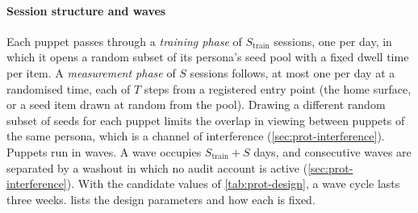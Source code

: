 \paragraph{Session structure and waves}
Each puppet passes through a \emph{training phase} of $S_{\mathrm{train}}$ sessions, one per day, in which it opens a random subset of its persona's seed pool with a fixed dwell time per item. A \emph{measurement phase} of $S$ sessions follows, at most one per day at a randomised time, each of $T$ steps from a registered entry point (the home surface, or a seed item drawn at random from the pool). Drawing a different random subset of seeds for each puppet limits the overlap in viewing between puppets of the same persona, which is a channel of interference (\cref{sec:prot-interference}). Puppets run in waves. A wave occupies $S_{\mathrm{train}}+S$ days, and consecutive waves are separated by a washout in which no audit account is active (\cref{sec:prot-interference}). With the candidate values of \cref{tab:prot-design}, a wave cycle lasts three weeks.  lists the design parameters and how each is fixed.

